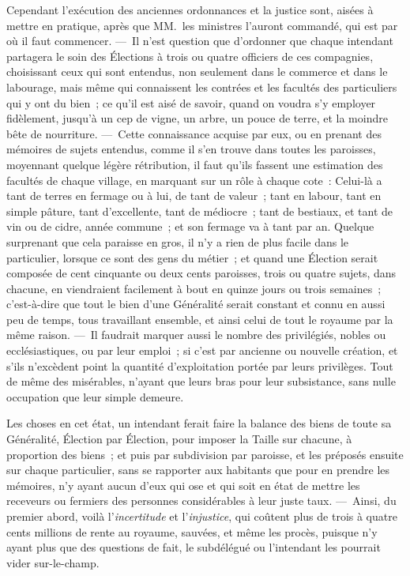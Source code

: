 \documentclass[french,twoside]{book} %
\begin{document}
Cependant l’exécution des anciennes ordonnances et la justice sont, aisées à mettre en pratique, après que MM. les ministres l’auront commandé, qui est par où il faut commencer. — Il n’est question que d’ordonner que chaque intendant partagera le soin des Élections à trois ou quatre officiers de ces compagnies, choisissant ceux qui sont entendus, non seulement dans le commerce et dans le labourage, mais même qui connaissent les contrées et les facultés des particuliers qui y ont du bien ; ce qu’il est aisé de savoir, quand on voudra s’y employer fidèlement, jusqu’à un cep de vigne, un arbre, un pouce de terre, et la moindre bête de nourriture. — Cette connaissance acquise par eux, ou en prenant des mémoires de sujets entendus, comme il s’en trouve dans toutes les paroisses, moyennant quelque légère rétribution, il faut qu’ils fassent une estimation des facultés de chaque village, en marquant sur un rôle à chaque cote : Celui-là a tant de terres en fermage ou à lui, de tant de valeur ; tant en labour, tant en simple pâture, tant d’excellente, tant de médiocre ; tant de bestiaux, et tant de vin ou de cidre, année commune ; et son fermage va à tant par an. Quelque surprenant que cela paraisse en gros, il n’y a rien de plus facile dans le particulier, lorsque ce sont des gens du métier ; et quand une Élection serait composée de cent cinquante ou deux cents paroisses, trois ou quatre sujets, dans chacune, en viendraient facilement à bout en quinze jours ou trois semaines ; c’est-à-dire que tout le bien d’une Généralité serait constant et connu en aussi peu de temps, tous travaillant ensemble, et ainsi celui de tout le royaume par la même raison. — Il faudrait marquer aussi le nombre des privilégiés, nobles ou ecclésiastiques, ou par leur emploi ; si c’est par ancienne ou nouvelle création, et s’ils n’excèdent point la quantité d’exploitation portée par leurs privilèges. Tout de même des misérables, n’ayant que leurs bras pour leur subsistance, sans nulle occupation que leur simple demeure.\par
Les choses en cet état, un intendant ferait faire la balance des biens de toute sa Généralité, Élection par Élection, pour imposer la Taille sur chacune, à proportion des biens ; et puis par subdivision par paroisse, et les préposés ensuite sur chaque particulier, sans se rapporter aux habitants que pour en prendre les mémoires, n’y ayant aucun d’eux qui ose et qui soit en état de mettre les receveurs ou fermiers des personnes considérables à leur juste taux. — Ainsi, du premier abord, voilà l’{\itshape incertitude} et l’{\itshape injustice}, qui coûtent plus de trois à quatre cents millions de rente au royaume, sauvées, et même les procès, puisque n’y ayant plus que des questions de fait, le subdélégué ou l’intendant les pourrait vider sur-le-champ.\par
\end{document}
